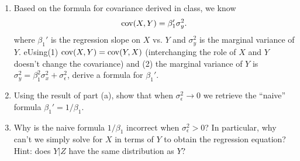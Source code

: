 \begin{exercise}
\begin{enumerate}[label=(\alph*)]
\item Based on the formula for covariance derived in class, we know 
\begin{equation*}
{\rm cov}(X,Y)  =\beta_1'\sigma_y^2.
\end{equation*}
where $\beta_1'$ is the regression slope on $X$ vs. $Y$ and $\sigma_y^2$ is the marginal variance of $Y$.  
eUsing(1)  ${\rm cov}(X,Y) = {\rm cov}(Y,X)$ (interchanging the role of $X$ and $Y$ doesn't change the covariance) and (2) the marginal variance of $Y$ is $\sigma_y^2 = \beta_1^2\sigma_x^2 + \sigma_{\epsilon}^2$, derive a formula for $\beta_1'$. 
\item Using the result of part (a), show that when $\sigma_{\epsilon}^2 \to 0$ we retrieve the ``naive'' formula $\beta_1' = 1/\beta_1$. 
\item Why is the naive formula $1/\beta_1$ incorrect when $\sigma_{\epsilon}^2>0$? In particular, why can't we simply solve for $X$ in terms of $Y$ to obtain the regression equation? Hint: does $Y|Z$ have the same distribution as $Y$? 
\end{enumerate}
\end{exercise}





 
 


